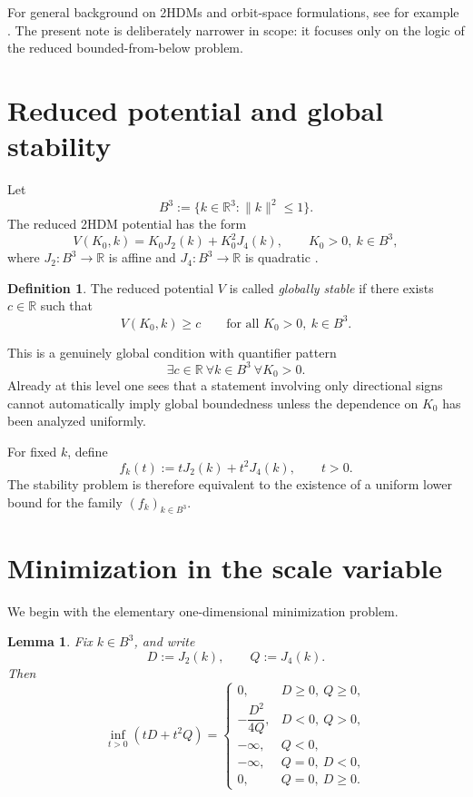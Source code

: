 \documentclass[11pt,a4paper]{article}
\theoremstyle{plain}
\newtheorem{lemma}[theorem]{Lemma}
\theoremstyle{definition}
\newtheorem{definition}[theorem]{Definition}
\theoremstyle{remark}
\newcommand{\R}{\mathbb{R}}
\newcommand{\norm}[1]{\lVert #1 \rVert}
\begin{document}
For general background on 2HDMs and orbit-space formulations, see for example \cite{Branco2012,Ivanov2007,Ivanov2008}. The present note is deliberately narrower in scope: it focuses only on the logic of the reduced bounded-from-below problem.

\section{Reduced potential and global stability}

Let
\[
B^3:=\{k\in \R^3:\norm{k}^2\le 1\}.
\]
The reduced 2HDM potential has the form
\begin{equation}\label{eq:reduced-potential}
V(K_0,k)=K_0J_2(k)+K_0^2J_4(k),
\qquad K_0>0,\ k\in B^3,
\end{equation}
where $J_2:B^3\to\R$ is affine and $J_4:B^3\to\R$ is quadratic \cite{Maniatis2006,ToobySmith2026}.

\begin{definition}
The reduced potential $V$ is called \emph{globally stable} if there exists $c\in\R$ such that
\[
V(K_0,k)\ge c
\qquad\text{for all }K_0>0,\ k\in B^3.
\]
\end{definition}

This is a genuinely global condition with quantifier pattern
\[
\exists c\in\R\ \forall k\in B^3\ \forall K_0>0.
\]
Already at this level one sees that a statement involving only directional signs cannot automatically imply global boundedness unless the dependence on $K_0$ has been analyzed uniformly.

For fixed $k$, define
\[
f_k(t):=tJ_2(k)+t^2J_4(k),\qquad t>0.
\]
The stability problem is therefore equivalent to the existence of a uniform lower bound for the family $(f_k)_{k\in B^3}$.

\section{Minimization in the scale variable}

We begin with the elementary one-dimensional minimization problem.

\begin{lemma}\label{lem:radial-infimum}
Fix $k\in B^3$, and write
\[
D:=J_2(k),\qquad Q:=J_4(k).
\]
Then
\[
\inf_{t>0}(tD+t^2Q)=
\begin{cases}
0, & D\ge 0,\ Q\ge 0,\\[1ex]
-\dfrac{D^2}{4Q}, & D<0,\ Q>0,\\[2ex]
-\infty, & Q<0,\\[1ex]
-\infty, & Q=0,\ D<0,\\[1ex]
0, & Q=0,\ D\ge 0.
\end{cases}
\]
\end{lemma}
\end{document}
